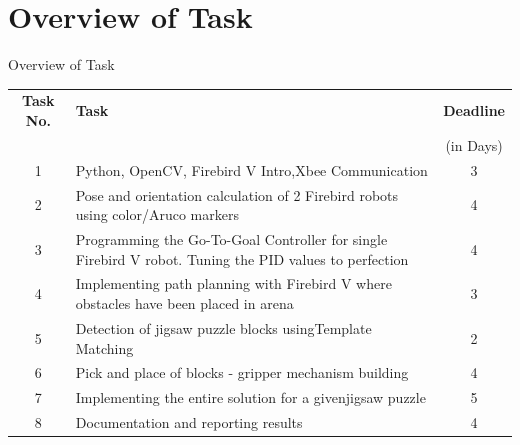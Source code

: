 \documentclass[10pt,a4paper]{beamer}
\begin{document}
\section{Overview of Task}
\begin{frame}{Overview of Task}
	\begin{tabular}{| c | p{17.5 em} | c |}\hline
		\textbf{Task No.} & \hspace{7em}\textbf{Task} & \textbf{Deadline} \\
		& & (in Days)\\\hline
		1 &\small{ Python, OpenCV, Firebird V Intro,\hspace{5 em}Xbee Communication} & 3 \\\hline
		2 &\small{ Pose and orientation calculation of 2 Firebird robots using color/Aruco markers }& 4\\\hline
		3 &\small{ Programming the Go-To-Goal Controller for single Firebird V robot. Tuning the PID\hspace{3 em} values to perfection }& 4\\\hline
		4 &\small{ Implementing path planning with Firebird V where obstacles have been placed in arena }& 3\\\hline
		5 &\small{ Detection of jigsaw puzzle blocks using\hspace{3 em}Template Matching} & 2\\\hline
		6 &\small{ Pick and place of blocks - gripper mechanism building }& 4\\\hline
		7 &\small{ Implementing the entire solution for a given\hspace{3 em}jigsaw puzzle }& 5\\\hline
		8 &\small{ Documentation and reporting results }& 4\\\hline
	\end{tabular}
\end{frame}
\end{document}
